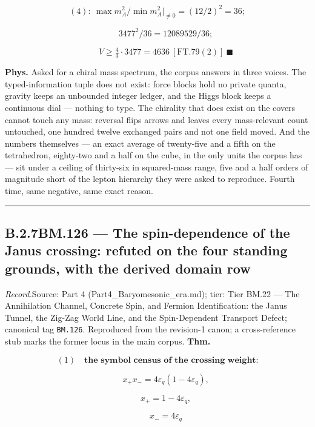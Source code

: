 \documentclass[11pt,openany]{report}
\theoremstyle{canonplain}
\theoremstyle{canondef}
\begin{document}
\[
(4):\ \max m_A^2/\min m_A^2\big|_{\ne0}=(12/2)^2=36;
\]

\[
\qquad 3477^2/36=12089529/36;
\]

\[
\qquad V\ge\tfrac43\cdot3477=4636\ [\mathrm{FT.79}(2)]\ \blacksquare
\]

\textbf{Phys.} Asked for a chiral mass spectrum, the corpus answers in three voices. The typed-information tuple does not exist: force blocks hold no private quanta, gravity keeps an unbounded integer ledger, and the Higgs block keeps a continuous dial — nothing to type. The chirality that does exist on the covers cannot touch any mass: reversal flips arrows and leaves every mass-relevant count untouched, one hundred twelve exchanged pairs and not one field moved. And the numbers themselves — an exact average of twenty-five and a fifth on the tetrahedron, eighty-two and a half on the cube, in the only units the corpus has — sit under a ceiling of thirty-six in squared-mass range, five and a half orders of magnitude short of the lepton hierarchy they were asked to reproduce. Fourth time, same negative, same exact reason.

\vspace{2pt}\noindent\rule{\textwidth}{0.4pt}\vspace{2pt}

\medskip
\subsection*{\texorpdfstring{B.2.7\quad BM.126 — The spin-dependence of the Janus crossing: refuted on the four standing grounds, with the derived domain row}{BM.126 B.2.7}}
\label{tag:BM-126}
{\small \textit{Record.}\quad Source: Part 4 (Part4\_Baryomesonic\_era.md); tier: Tier BM.22 — The Annihilation Channel, Concrete Spin, and Fermion Identification: the Janus Tunnel, the Zig-Zag World Line, and the Spin-Dependent Transport Defect; canonical tag \texttt{BM.126}. Reproduced from the revision-1 canon; a cross-reference stub marks the former locus in the main corpus.}
\medskip
\textbf{Thm.}

\[
(1)\quad\textbf{the symbol census of the crossing weight:}
\]

\[
\qquad x_+x_-=4\varepsilon_q(1-4\varepsilon_q),
\]

\[
\qquad x_+=1-4\varepsilon_q,
\]

\[
\qquad x_-=4\varepsilon_q
\]
\end{document}
